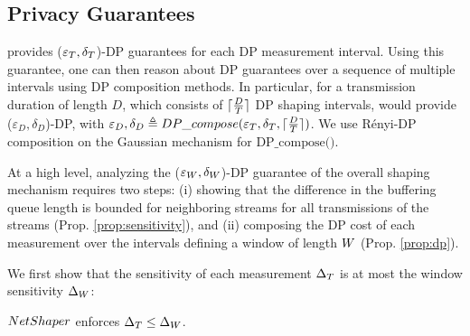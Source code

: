 \fi



\subsection{Privacy Guarantees}
\label{subsec:dp-proof}
{\sys} provides ($\varepsilon_{T}, \delta_{T}$)-DP guarantees for
each DP measurement interval. Using this guarantee, one can then reason about DP
guarantees over a sequence of multiple intervals using DP composition methods.
In particular, for a transmission duration of length $D$, which consists of
$\lceil \frac{D}{T} \rceil$ DP shaping intervals, {\sys} would provide
($\varepsilon_{D}, \delta_{D}$)-DP, with $\varepsilon_{D}, \delta_{D} \triangleq
DP\_compose(\varepsilon_{T}, \delta_{T}, \lceil \frac{D}{T}
\rceil)$. We use R\'enyi-DP composition on the Gaussian mechanism for
$\textrm{DP\_compose()}$.

At a high level, analyzing the  ($\varepsilon_{W}, \delta_{W}$)-DP
guarantee of the overall shaping mechanism requires two steps: (i) showing that
the difference in the buffering queue length is bounded for neighboring streams
for all transmissions of the streams (Prop. \ref{prop:sensitivity}), and (ii)
composing the DP cost of each measurement over the intervals defining a window
of length $W$ (Prop. \ref{prop:dp}).

We first show that the sensitivity of each measurement $\Delta_T$ is at most the
window sensitivity $\Delta_{W}$:
\begin{proposition}\label{prop:sensitivity}
    {${NetShaper}$} enforces $\Delta_T \leq \Delta_{W}$.
\end{proposition}

